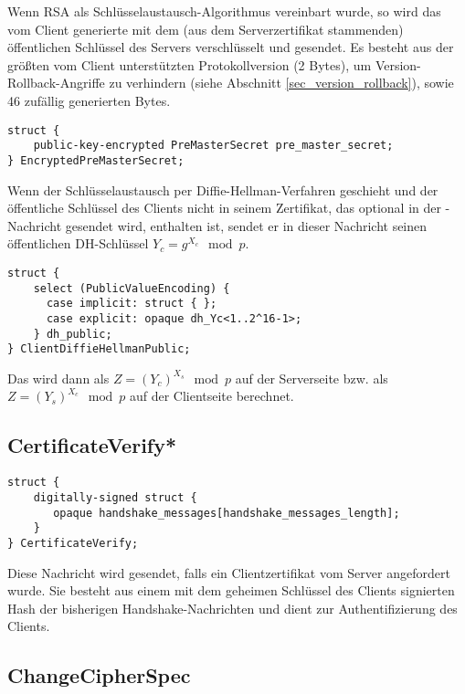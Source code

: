 Wenn RSA als Schlüsselaustausch-Algorithmus vereinbart wurde, so wird das vom Client generierte \premastersecret{} mit dem (aus dem Serverzertifikat stammenden) öffentlichen Schlüssel des Servers verschlüsselt und gesendet. Es besteht aus der größten vom Client unterstützten Protokollversion (2 Bytes), um Version-Rollback-Angriffe zu verhindern (siehe Abschnitt \ref{sec_version_rollback}), sowie 46 zufällig generierten Bytes.

\begin{lstlisting}
struct {
	public-key-encrypted PreMasterSecret pre_master_secret;
} EncryptedPreMasterSecret;
\end{lstlisting}

Wenn der Schlüsselaustausch per Diffie-Hellman-Verfahren geschieht und der öffentliche Schlüssel des Clients nicht in seinem Zertifikat, das optional in der \clientcertificate{}-Nachricht gesendet wird, enthalten ist, sendet er in dieser Nachricht seinen öffentlichen DH-Schlüssel \(Y_c = g^{X_c} \mod{p}\).

\begin{lstlisting}
struct {
	select (PublicValueEncoding) {
	  case implicit: struct { };
	  case explicit: opaque dh_Yc<1..2^16-1>;
	} dh_public;
} ClientDiffieHellmanPublic;
\end{lstlisting}

Das \premastersecret{} wird dann als \(Z=(Y_c)^{X_s} \mod{p}\) auf der Serverseite bzw. als \(Z=(Y_s)^{X_c} \mod{p}\) auf der Clientseite berechnet.

\subsection{CertificateVerify*}

\begin{lstlisting}
struct {
	digitally-signed struct {
	   opaque handshake_messages[handshake_messages_length];
	}
} CertificateVerify;
\end{lstlisting}

Diese Nachricht wird gesendet, falls ein Clientzertifikat vom Server angefordert wurde. Sie besteht aus einem mit dem geheimen Schlüssel des Clients signierten Hash der bisherigen Handshake-Nachrichten und dient zur Authentifizierung des Clients.

\subsection{ChangeCipherSpec}

